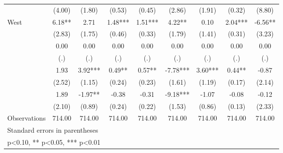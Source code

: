 {\begin{tabular}{l*{8}{c}}
                &     (4.00)   &     (1.80)   &     (0.53)   &     (0.45)   &     (2.86)   &     (1.91)   &     (0.32)   &     (8.80)   \\
\addlinespace
West            &       6.18** &       2.71   &       1.48***&       1.51***&       4.22** &       0.10   &       2.04***&      -6.56** \\
                &     (2.83)   &     (1.75)   &     (0.46)   &     (0.33)   &     (1.79)   &     (1.41)   &     (0.31)   &     (3.23)   \\
\addlinespace
1940            &       0.00   &       0.00   &       0.00   &       0.00   &       0.00   &       0.00   &       0.00   &       0.00   \\
                &        (.)   &        (.)   &        (.)   &        (.)   &        (.)   &        (.)   &        (.)   &        (.)   \\
\addlinespace
1950            &       1.93   &       3.92***&       0.49** &       0.57** &      -7.78***&       3.60***&       0.44** &      -0.87   \\
                &     (2.52)   &     (1.15)   &     (0.24)   &     (0.23)   &     (1.61)   &     (1.19)   &     (0.17)   &     (2.14)   \\
\addlinespace
1960            &       1.89   &      -1.97** &      -0.38   &      -0.31   &      -9.18***&      -1.07   &      -0.08   &      -0.12   \\
                &     (2.10)   &     (0.89)   &     (0.24)   &     (0.22)   &     (1.53)   &     (0.86)   &     (0.13)   &     (2.33)   \\
\midrule
Observations    &     714.00   &     714.00   &     714.00   &     714.00   &     714.00   &     714.00   &     714.00   &     714.00   \\
\bottomrule
\multicolumn{9}{l}{\footnotesize Standard errors in parentheses}\\
\multicolumn{9}{l}{\footnotesize * p<0.10, ** p<0.05, *** p<0.01}\\
\end{tabular}
}
